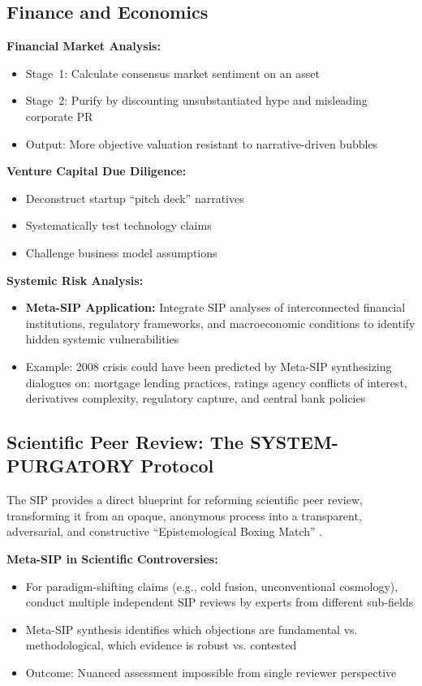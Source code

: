 \documentclass[11pt,a4paper]{article}
\begin{document}
\begin{small}
\subsection{Finance and Economics}

\textbf{Financial Market Analysis:}
\begin{itemize}[nosep]
    \item Stage~1: Calculate consensus market sentiment on an asset
    \item Stage~2: Purify by discounting unsubstantiated hype and misleading corporate PR
    \item Output: More objective valuation resistant to narrative-driven bubbles
\end{itemize}

\textbf{Venture Capital Due Diligence:}
\begin{itemize}[nosep]
    \item Deconstruct startup ``pitch deck'' narratives
    \item Systematically test technology claims
    \item Challenge business model assumptions
\end{itemize}

\textbf{Systemic Risk Analysis:}
\begin{itemize}[nosep]
    \item \textbf{Meta-SIP Application:} Integrate SIP analyses of interconnected financial institutions, regulatory frameworks, and macroeconomic conditions to identify hidden systemic vulnerabilities
    \item Example: 2008 crisis could have been predicted by Meta-SIP synthesizing dialogues on: mortgage lending practices, ratings agency conflicts of interest, derivatives complexity, regulatory capture, and central bank policies
\end{itemize}

\subsection{Scientific Peer Review: The SYSTEM-PURGATORY Protocol}

The SIP provides a direct blueprint for reforming scientific peer review, transforming it from an opaque, anonymous process into a transparent, adversarial, and constructive ``Epistemological Boxing Match'' \citep{KovnatskySVE3}.

\textbf{Meta-SIP in Scientific Controversies:}
\begin{itemize}[nosep]
    \item For paradigm-shifting claims (e.g., cold fusion, unconventional cosmology), conduct multiple independent SIP reviews by experts from different sub-fields
    \item Meta-SIP synthesis identifies which objections are fundamental vs. methodological, which evidence is robust vs. contested
    \item Outcome: Nuanced assessment impossible from single reviewer perspective
\end{itemize}


\end{small}
\end{document}
